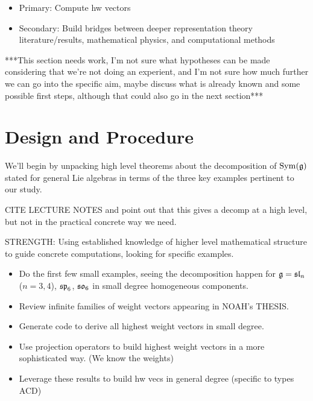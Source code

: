 \documentclass[11pt, reqno]{amsart}
\begin{document}
\begin{itemize}
\item Primary: Compute hw vectors
\item Secondary: Build bridges between deeper representation theory literature/results, mathematical physics, and computational methods


\end{itemize}




***This section needs work, I'm not sure what hypotheses can be made considering that we're not doing an experient, and I'm not sure how much further we can go into the specific aim, maybe discuss what is already known and some possible first steps, although that could also go in the next section***

\section{Design and Procedure}




We'll begin by unpacking high level theorems about the decomposition of $\operatorname{Sym}(\mathfrak{g})$ stated for general Lie algebras in terms of the three key examples pertinent to our study. 

CITE LECTURE NOTES and point out that this gives a decomp at a high level, but not in the practical concrete way we need.

STRENGTH: Using established knowledge of higher level mathematical structure to guide concrete computations, looking for specific examples. 

\begin{itemize}
\item Do the first few small examples, seeing the decomposition happen for $\mathfrak{g} = \mathfrak{sl}_n$ ($n=3,4$), $\mathfrak{sp}_{6}$, $\mathfrak{so}_6$ in small degree homogeneous components. 
\item Review infinite families of weight vectors appearing in NOAH's THESIS. 
\item Generate code to derive all highest weight vectors in small degree.
\item Use projection operators to build highest weight vectors in a more sophisticated way. (We know the weights)
\item Leverage these results to build hw vecs in general degree (specific to types ACD)
\end{itemize}
\end{document}

